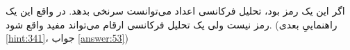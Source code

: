 \section{}
\paragraph{}\label{hint:220}
اگر این یک رمز بود، تحلیل فرکانسی اعداد می‌توانست سرنخی بدهد. در واقع این یک رمز نیست ولی یک تحلیل فرکانسی ارقام می‌تواند مفید واقع شود. (راهنماییِ بعدی \ref{hint:341}، جواب \ref{answer:53})